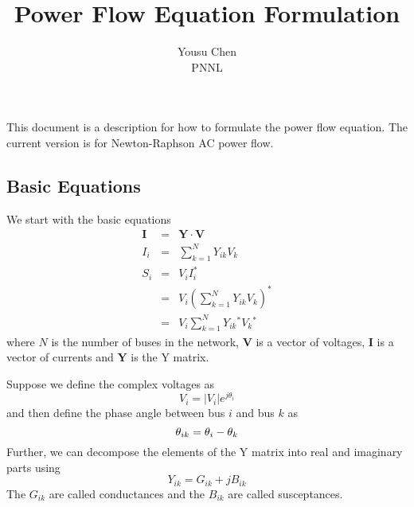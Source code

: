 \documentclass[12pt]{article}
\begin{document}
\title{Power Flow Equation Formulation}
\author{Yousu Chen \\PNNL}
\maketitle
This document is a description for how to formulate the power flow equation.
The current version is for Newton-Raphson AC power flow.

\subsection*{Basic Equations}
We start with the basic equations
\begin{eqnarray}
\label{eq:IYV}
\mathbf{I}&=&\mathbf{Y}\cdot\mathbf{V}\\
\label{eq:Ik}
I_{i}&=&\sum_{k=1}^{N}Y_{ik}V_{k}\\
\label{eq:Sk}
S{_i}&=& V{_i}I_{i}^{*} \nonumber \\
     &=& V{_i}\left ( \sum_{k=1}^{N}Y{_{ik}}V{_k} \right )^{*}  \nonumber \\          
     &=& V{_i}\sum_{k=1}^{N}Y{_{ik}}^{*}V{_k}^{*}
\end{eqnarray} 
where $N$ is the number of buses in the network, $\mathbf{V}$ is a vector of
voltages, $\mathbf{I}$ is a vector of currents and $\mathbf{Y}$ is the Y matrix.

Suppose we define the complex voltages as 
\begin{equation}
\label{eq:CXV}
V{_i}= |V{_i}|e^{j\theta_{i}}
\end{equation} 
and then define the phase angle between bus $i$ and bus $k$ as
\begin{equation}
\theta_{ik}=\theta_{i}-\theta_{k} \\
\end{equation} 
Further, we can decompose the elements of the Y matrix into real and imaginary
parts using
\begin{equation}
Y_{ik}=G_{ik}+jB_{ik}
\end{equation} 
The $G_{ik}$ are called conductances and the $B_{ik}$ are called susceptances. 
\end{document}
